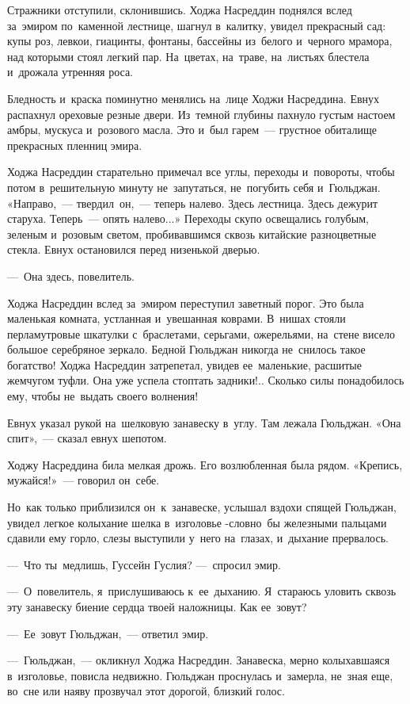 \documentclass[12pt,a4paper]{book}
\begin{document}
Стражники отступили, склонившись. Ходжа Насреддин поднялся вслед за~эмиром по~каменной лестнице, шагнул в~калитку, увидел прекрасный сад: купы роз, левкои, гиацинты, фонтаны, бассейны из~белого и~черного мрамора, над которыми стоял легкий пар. На~цветах, на~траве, на~листьях блестела и~дрожала утренняя роса.

Бледность и~краска поминутно менялись на~лице Ходжи Насреддина. Евнух распахнул ореховые резные двери. Из~темной глубины пахнуло густым настоем амбры, мускуса и~розового масла. Это и~был гарем~— грустное обиталище прекрасных пленниц эмира.

Ходжа Насреддин старательно примечал все углы, переходы и~повороты, чтобы потом в~решительную минуту не~запутаться, не~погубить себя и~Гюльджан. «Направо,~— твердил~он,~— теперь налево. Здесь лестница. Здесь дежурит старуха. Теперь~— опять налево...» Переходы скупо освещались голубым, зеленым и~розовым светом, пробивавшимся сквозь китайские разноцветные стекла. Евнух остановился перед низенькой дверью.

—~Она здесь, повелитель.

Ходжа Насреддин вслед за~эмиром переступил заветный порог. Это была маленькая комната, устланная и~увешанная коврами. В~нишах стояли перламутровые шкатулки с~браслетами, серьгами, ожерельями, на~стене висело большое серебряное зеркало. Бедной Гюльджан никогда не~снилось такое богатство! Ходжа Насреддин затрепетал, увидев ее~маленькие, расшитые жемчугом туфли. Она уже успела стоптать задники!.. Сколько силы понадобилось ему, чтобы не~выдать своего волнения!

Евнух указал рукой на~шелковую занавеску в~углу. Там лежала Гюльджан. «Она спит»,~— сказал евнух шепотом.

Ходжу Насреддина била мелкая дрожь. Его возлюбленная была рядом. «Крепись, мужайся!»~— говорил он~себе.

Но~как только приблизился он~к~занавеске, услышал вздохи спящей Гюльджан, увидел легкое колыхание шелка в~изголовье -словно~бы железными пальцами сдавили ему горло, слезы выступили у~него на~глазах, и~дыхание прервалось.

—~Что ты~медлишь, Гуссейн Гуслия? —~спросил эмир.

—~О~повелитель, я~прислушиваюсь к~ее~дыханию. Я~стараюсь уловить сквозь эту занавеску биение сердца твоей наложницы. Как ее~зовут?

—~Ее~зовут Гюльджан,~— ответил эмир.

—~Гюльджан,~— окликнул Ходжа Насреддин. Занавеска, мерно колыхавшаяся в~изголовье, повисла недвижно. Гюльджан проснулась и~замерла, не~зная еще, во~сне или наяву прозвучал этот дорогой, близкий голос.
\end{document}
